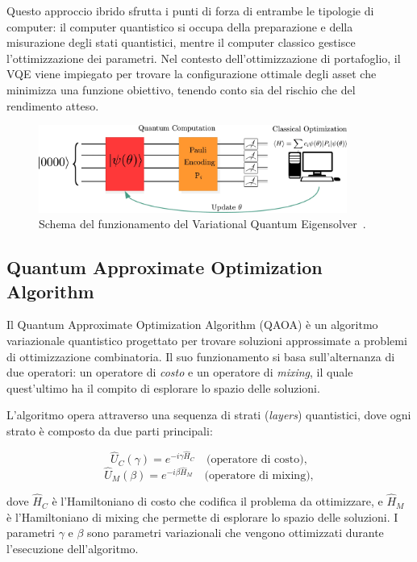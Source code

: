 Questo approccio ibrido sfrutta i punti di forza di entrambe le tipologie di 
computer: il computer quantistico si occupa della preparazione e della misurazione 
degli stati quantistici, mentre il computer classico gestisce l'ottimizzazione 
dei parametri. Nel contesto dell'ottimizzazione di portafoglio, il VQE viene 
impiegato per trovare la configurazione ottimale degli asset che minimizza una 
funzione obiettivo, tenendo conto sia del rischio che del rendimento atteso.

\begin{figure}[h!]\label{fig:figvqe}
    \centering
    \includegraphics[width=0.9\textwidth]{images/vqe.png}
    \caption{Schema del funzionamento del Variational Quantum Eigensolver~\cite{buonaiuto2023best}.}
\end{figure}




\subsection{Quantum Approximate Optimization Algorithm}\label{sec:qaoa}
Il Quantum Approximate Optimization Algorithm (QAOA) è un algoritmo variazionale 
quantistico progettato per trovare soluzioni approssimate a problemi di 
ottimizzazione combinatoria. Il suo funzionamento si basa sull'alternanza di 
due operatori: un operatore di \textit{costo} e un operatore di \textit{mixing}, 
il quale quest'ultimo ha il compito di esplorare lo spazio delle soluzioni.

L'algoritmo opera attraverso una sequenza di strati (\textit{layers}) quantistici, 
dove ogni strato è composto da due parti principali:

\begin{equation}
   \hat{U}_C(\gamma) = e^{-i\gamma \hat{H}_C} \quad \text{(operatore di costo)},
\end{equation}
\begin{equation}    
   \hat{U}_M(\beta) = e^{-i\beta \hat{H}_M} \quad \text{(operatore di mixing)},
\end{equation}

dove $\hat{H}_C$ è l'Hamiltoniano di costo che codifica il problema da ottimizzare, 
e $\hat{H}_M$ è l'Hamiltoniano di mixing che permette di esplorare lo spazio delle 
soluzioni. I parametri $\gamma$ e $\beta$ sono parametri variazionali che vengono 
ottimizzati durante l'esecuzione dell'algoritmo.

